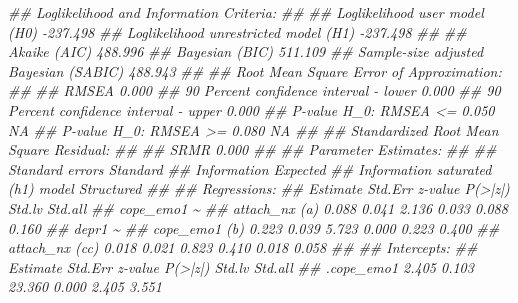 \documentclass[
  chinese-hans,
  letterpaper,
  DIV=11,
  numbers=noendperiod]{scrartcl}
\newenvironment{Shaded}{\begin{snugshade}}{\end{snugshade}}
\newcommand{\DocumentationTok}[1]{\textcolor[rgb]{0.37,0.37,0.37}{\textit{#1}}}
\begin{document}
\begin{Shaded}
\begin{Highlighting}[numbers=left,,]
\DocumentationTok{\#\# Loglikelihood and Information Criteria:}
\DocumentationTok{\#\# }
\DocumentationTok{\#\#   Loglikelihood user model (H0)               {-}237.498}
\DocumentationTok{\#\#   Loglikelihood unrestricted model (H1)       {-}237.498}
\DocumentationTok{\#\#                                                       }
\DocumentationTok{\#\#   Akaike (AIC)                                 488.996}
\DocumentationTok{\#\#   Bayesian (BIC)                               511.109}
\DocumentationTok{\#\#   Sample{-}size adjusted Bayesian (SABIC)        488.943}
\DocumentationTok{\#\# }
\DocumentationTok{\#\# Root Mean Square Error of Approximation:}
\DocumentationTok{\#\# }
\DocumentationTok{\#\#   RMSEA                                          0.000}
\DocumentationTok{\#\#   90 Percent confidence interval {-} lower         0.000}
\DocumentationTok{\#\#   90 Percent confidence interval {-} upper         0.000}
\DocumentationTok{\#\#   P{-}value H\_0: RMSEA \textless{}= 0.050                       NA}
\DocumentationTok{\#\#   P{-}value H\_0: RMSEA \textgreater{}= 0.080                       NA}
\DocumentationTok{\#\# }
\DocumentationTok{\#\# Standardized Root Mean Square Residual:}
\DocumentationTok{\#\# }
\DocumentationTok{\#\#   SRMR                                           0.000}
\DocumentationTok{\#\# }
\DocumentationTok{\#\# Parameter Estimates:}
\DocumentationTok{\#\# }
\DocumentationTok{\#\#   Standard errors                             Standard}
\DocumentationTok{\#\#   Information                                 Expected}
\DocumentationTok{\#\#   Information saturated (h1) model          Structured}
\DocumentationTok{\#\# }
\DocumentationTok{\#\# Regressions:}
\DocumentationTok{\#\#                    Estimate  Std.Err  z{-}value  P(\textgreater{}|z|)   Std.lv  Std.all}
\DocumentationTok{\#\#   cope\_emo1 \textasciitilde{}                                                           }
\DocumentationTok{\#\#     attach\_nx  (a)    0.088    0.041    2.136    0.033    0.088    0.160}
\DocumentationTok{\#\#   depr1 \textasciitilde{}                                                               }
\DocumentationTok{\#\#     cope\_emo1  (b)    0.223    0.039    5.723    0.000    0.223    0.400}
\DocumentationTok{\#\#     attach\_nx (cc)    0.018    0.021    0.823    0.410    0.018    0.058}
\DocumentationTok{\#\# }
\DocumentationTok{\#\# Intercepts:}
\DocumentationTok{\#\#                    Estimate  Std.Err  z{-}value  P(\textgreater{}|z|)   Std.lv  Std.all}
\DocumentationTok{\#\#    .cope\_emo1         2.405    0.103   23.360    0.000    2.405    3.551}

\end{Highlighting}
\end{Shaded}
\end{document}
